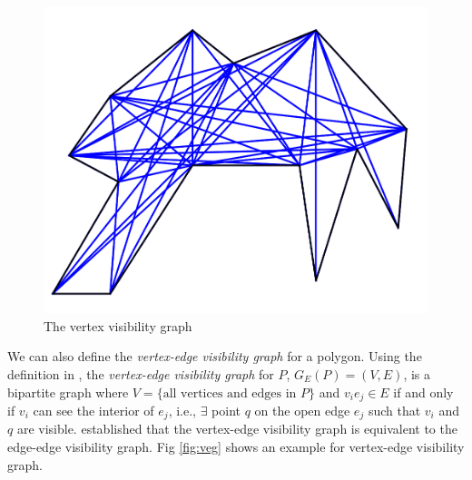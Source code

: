 \documentclass[]{article}  %
\begin{document}
\begin{figure}
    \includegraphics[width=0.8\linewidth]{figures/viz_graph.png}
    \centering
    \caption{The vertex visibility graph}\label{fig:vvg}
    \centering
\end{figure}

We can also define the \textit{vertex-edge visibility graph} for a polygon. Using the definition in \cite{rourke_viz}, the \textit{vertex-edge visibility graph} for $P$, $G_E(P) = (V, E)$, is a bipartite graph where $V = \{\text{all vertices and edges in $P$}\}$ and $v_ie_j\in E$ if and only if $v_i$ can see the interior of $e_j$, i.e., $\exists$ point $q$ on the open edge $e_j$ such that $v_i$ and $q$ are visible. \cite{rourke_viz} established that the vertex-edge visibility graph is equivalent to the edge-edge visibility graph.
Fig \ref{fig:veg} shows an example for vertex-edge visibility graph.
\end{document}
